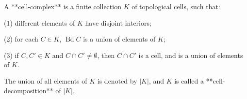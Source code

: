 A **cell-complex** is a finite collection $K$ of topological cells, such that:

(1) different elements of $K$ have disjoint interiors;

(2) for each $C \in K$, $\operatorname{Bd} C$ is a union of elements of $K$;

(3) if $C, C' \in K$ and $C \cap C' \neq \emptyset$, then $C \cap C'$ is a cell, and is a union of elements of $K$.

The union of all elements of $K$ is denoted by $|K|$, and $K$ is called a **cell-decomposition** of $|K|$.
